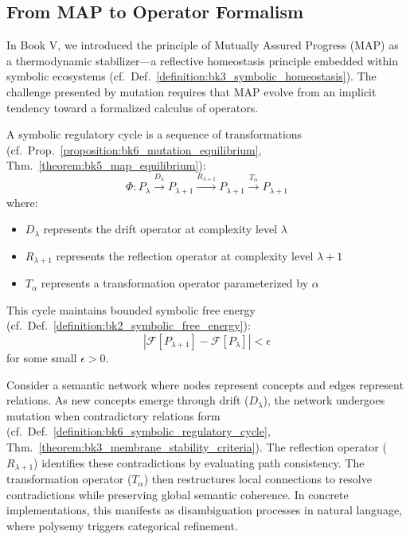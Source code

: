 \subsection{From MAP to Operator Formalism}
\label{subsec:bk6_from_map_to_operator_formalism}
In Book V, we introduced the principle of Mutually Assured Progress (MAP) as a thermodynamic stabilizer—a reflective homeostasis principle embedded within symbolic ecosystems (cf.~Def.~\ref{definition:bk3_symbolic_homeostasis}). The challenge presented by mutation requires that MAP evolve from an implicit tendency toward a formalized calculus of operators.
\begin{definition}
\label{definition:bk6_symbolic_regulatory_cycle}
A symbolic regulatory cycle is a sequence of transformations (cf.~Prop.~\ref{proposition:bk6_mutation_equilibrium}, Thm.~\ref{theorem:bk5_map_equilibrium}):
\begin{equation}
\Phi: P_{\lambda} \xrightarrow{D_{\lambda}} P_{\lambda+1} \xrightarrow{R_{\lambda+1}} P_{\lambda+1} \xrightarrow{T_{\alpha}} P_{\lambda+1}
\end{equation}
where:
\begin{itemize}
\item $D_{\lambda}$ represents the drift operator at complexity level $\lambda$
\item $R_{\lambda+1}$ represents the reflection operator at complexity level $\lambda+1$
\item $T_{\alpha}$ represents a transformation operator parameterized by $\alpha$
\end{itemize}
This cycle maintains bounded symbolic free energy (cf.~Def.~\ref{definition:bk2_symbolic_free_energy}):
\begin{equation}
|\mathcal{F}[P_{\lambda+1}] - \mathcal{F}[P_{\lambda}]| < \epsilon
\end{equation}
for some small $\epsilon > 0$.
\end{definition}
\begin{scholium}
\label{scholium:bk6_semantic_network_regulation}
Consider a semantic network where nodes represent concepts and edges represent relations. As new concepts emerge through drift ($D_{\lambda}$), the network undergoes mutation when contradictory relations form (cf.~Def.~\ref{definition:bk6_symbolic_regulatory_cycle}, Thm.~\ref{theorem:bk3_membrane_stability_criteria}). The reflection operator ($R_{\lambda+1}$) identifies these contradictions by evaluating path consistency. The transformation operator ($T_{\alpha}$) then restructures local connections to resolve contradictions while preserving global semantic coherence. In concrete implementations, this manifests as disambiguation processes in natural language, where polysemy triggers categorical refinement.
\end{scholium}
